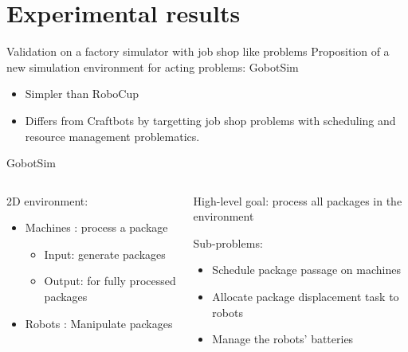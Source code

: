 \section{Experimental results}
\begin{frame}{Validation on a factory simulator with job shop like problems}
    Proposition of a new simulation environment for acting problems: GobotSim
    \begin{itemize}
        \item Simpler than RoboCup
        \item Differs from Craftbots by targetting job shop problems with scheduling and resource management problematics.
    \end{itemize}
\end{frame}

\begin{frame}{GobotSim}
    \begin{columns}
        \begin{column}{0.5\textwidth}
            2D environment:
            \begin{itemize}
                \item Machines : process a package
                \begin{itemize}
                    \item Input: generate packages
                    \item Output: for fully processed packages
                \end{itemize}
                \item Robots : Manipulate packages
            \end{itemize}
        \end{column}
        \begin{column}{0.5\textwidth}
            High-level goal: process all packages in the environment
            
            Sub-problems: 
            \begin{itemize}
                \item Schedule package passage on machines
                \item Allocate package displacement task to robots
                \item Manage the robots' batteries 
            \end{itemize}
        \end{column}
    \end{columns}
\end{frame}

